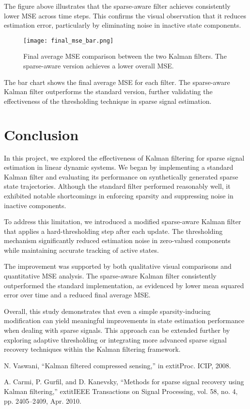 \documentclass[12pt]{article}
\begin{document}
The figure above illustrates that the sparse-aware filter achieves consistently lower MSE across time steps. This confirms the visual observation that it reduces estimation error, particularly by eliminating noise in inactive state components.

\begin{figure}[h!]
  \centering
  \texttt{[image: final\_mse\_bar.png]}
  \caption{Final average MSE comparison between the two Kalman filters. The sparse-aware version achieves a lower overall MSE.}
  \label{fig:mse-final-bar}
\end{figure}

The bar chart shows the final average MSE for each filter. The sparse-aware Kalman filter outperforms the standard version, further validating the effectiveness of the thresholding technique in sparse signal estimation.

\section{Conclusion}

In this project, we explored the effectiveness of Kalman filtering for sparse signal estimation in linear dynamic systems. We began by implementing a standard Kalman filter and evaluating its performance on synthetically generated sparse state trajectories. Although the standard filter performed reasonably well, it exhibited notable shortcomings in enforcing sparsity and suppressing noise in inactive components.

To address this limitation, we introduced a modified sparse-aware Kalman filter that applies a hard-thresholding step after each update. The thresholding mechanism significantly reduced estimation noise in zero-valued components while maintaining accurate tracking of active states.

The improvement was supported by both qualitative visual comparisons and quantitative MSE analysis. The sparse-aware Kalman filter consistently outperformed the standard implementation, as evidenced by lower mean squared error over time and a reduced final average MSE.

Overall, this study demonstrates that even a simple sparsity-inducing modification can yield meaningful improvements in state estimation performance when dealing with sparse signals. This approach can be extended further by exploring adaptive thresholding or integrating more advanced sparse signal recovery techniques within the Kalman filtering framework.


\begin{thebibliography}{1}
N. Vaswani, ``Kalman filtered compressed sensing,'' in 	extit{Proc. ICIP}, 2008.

A. Carmi, P. Gurfil, and D. Kanevsky, ``Methods for sparse signal recovery using Kalman filtering,'' 	extit{IEEE Transactions on Signal Processing}, vol. 58, no. 4, pp. 2405--2409, Apr. 2010.
\end{thebibliography}
\end{document}
